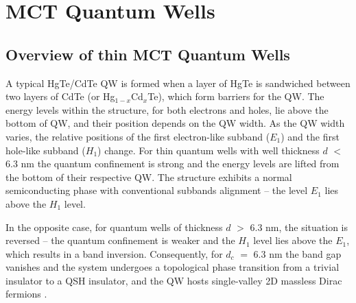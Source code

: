 \documentclass[titlepage,a4paper]{book}
\newcommand{\wciecie}{\quad\phantom{v}}
\begin{document}




\chapter{MCT Quantum Wells}
\label{chpt:MCT_QW}

\section{Overview of thin MCT Quantum Wells}
\wciecie
A typical HgTe/CdTe QW is formed when a layer of HgTe is sandwiched between two layers of CdTe (or Hg$_{1-x}$Cd$_x$Te), which form barriers for the QW. The energy levels within the structure, for both electrons and holes, lie above the bottom of QW, and their position depends on the QW width. As the QW width varies, the relative positions of the first electron-like subband ($E_1$) and the first hole-like subband ($H_1$) change. For thin quantum wells with well thickness $d$ $<$ 6.3 nm the quantum confinement is strong and the energy levels are lifted from the bottom of their respective QW. The structure exhibits a normal semiconducting phase with conventional subbands alignment -- the level $E_1$ lies above the $H_1$ level. 

In the opposite case, for quantum wells of thickness $d$ $>$ 6.3 nm, the situation is reversed -- the quantum confinement is weaker and the $H_1$ level lies above the $E_1$, which results in a band inversion. Consequently, for $d_c$ $=$ 6.3 nm the band gap vanishes and the system undergoes a topological phase transition from a trivial insulator to a QSH insulator, and the QW hosts single-valley 2D massless Dirac fermions \cite{Buttner_MCT_SQW}. 
\end{document}
